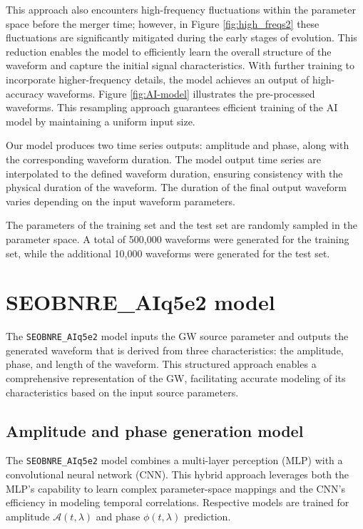 \documentclass[
reprint,
superscriptaddress,
amsmath,amssymb,
aps,
prd,
floatfix,
]{revtex4-2}
\begin{document}
This approach also encounters high-frequency fluctuations within the parameter space before the merger time; however, in Figure \ref{fig:high_freqs2} these fluctuations are significantly mitigated during the early stages of evolution. 
This reduction enables the model to efficiently learn the overall structure of the waveform and capture the initial signal characteristics. 
With further training to incorporate higher-frequency details, the model achieves an output of high-accuracy waveforms.
Figure \ref{fig:AI-model} illustrates the pre-processed waveforms.
This resampling approach guarantees efficient training of the AI model by maintaining a uniform input size. 

Our model produces two time series outputs: amplitude and phase, along with the corresponding waveform duration. 
The model output time series are interpolated to the defined waveform duration, ensuring consistency with the physical duration of the waveform. The duration of the final output waveform varies depending on the input waveform parameters.

The parameters of the training set and the test set are randomly sampled in the parameter space.
A total of 500,000 waveforms were generated for the training set, while the additional 10,000 waveforms were generated for the test set. 

\section{SEOBNRE\_AIq5e2 model}
\label{sec:met}
The \texttt{SEOBNRE\_AIq5e2} model inputs the GW source parameter and outputs the generated waveform that is derived from three characteristics: the amplitude, phase, and length of the waveform.
This structured approach enables a comprehensive representation of the GW, facilitating accurate modeling of its characteristics based on the input source parameters.

\subsection{Amplitude and phase generation model}
The \texttt{SEOBNRE\_AIq5e2} model combines a multi-layer perception (MLP) with a convolutional neural network (CNN). 
This hybrid approach leverages both the MLP's capability to learn complex parameter-space mappings and the CNN's efficiency in modeling temporal correlations.
Respective models are trained for amplitude $\mathcal{A}(t,\lambda)$ and phase $\phi(t,\lambda)$ prediction. 
\end{document}
